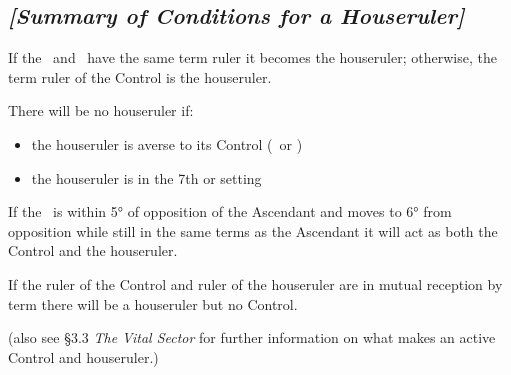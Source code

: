 \begin{mdframed}[backgroundcolor=cyan!5]
\subsection{\textit{[Summary of Conditions for a Houseruler]}}
If the \Sun\, and \Moon\, have the same term ruler it becomes the houseruler; otherwise, the term ruler of the Control is the houseruler.

\noindent There will be no houseruler if:
\vspace{-1em}
\begin{itemize}
\item the houseruler is averse to its Control (\Sun\, or \Moon)
\item the houseruler is in the 7th or setting
\end{itemize}

If the \Moon\, is within 5° of opposition of the Ascendant and moves to 6° from opposition while still in the same terms as the Ascendant it will act as both the Control and the houseruler.

If the ruler of the Control and ruler of the houseruler are in mutual reception by term there will be a houseruler but no Control.

(also see \S3.3 \textsl{The Vital Sector} for further information on what makes an active Control and houseruler.)
\end{mdframed}

\newpage